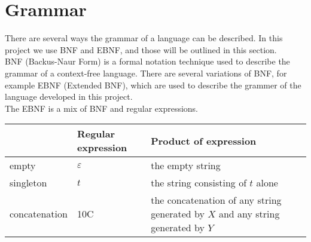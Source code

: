 \section{Grammar}
\label{sec:ebnf}

There are several ways the grammar of a language can be described. In this project we use BNF and EBNF, and those will be outlined in this section.\\
BNF (Backus-Naur Form) is a formal notation technique used to describe the grammar of a context-free language. There are several variations of BNF, for example EBNF (Extended BNF), which are used to describe the grammer of the language developed in this project.\\
The EBNF is a mix of BNF and regular expressions.

\begin{center}
    \begin{tabular}{ | l | l | l |}
    \hline
     & Regular expression & Product of expression\\ \hline
    empty & $\varepsilon$ & the empty string\\ \hline
    singleton & $t$ & the string consisting of $t$ alone\\ \hline
    concatenation & 10C & the concatenation of any string generated by $X$ and any string generated by $Y$\\
    \hline
    \end{tabular}
\end{center}